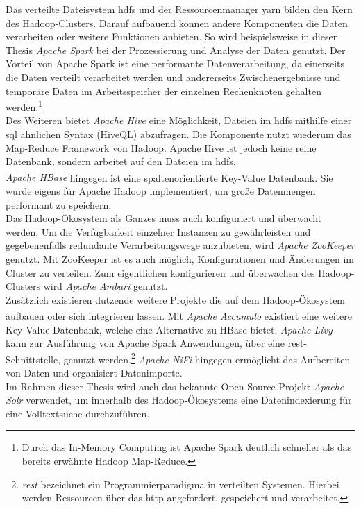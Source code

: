 \noindent
Das verteilte Dateisystem \gls{hdfs} und der Ressourcenmanager \acrshort{yarn} bilden den Kern des Hadoop-Clusters. Darauf aufbauend können andere Komponenten die Daten verarbeiten oder weitere Funktionen anbieten.
So wird beispielsweise in dieser Thesis \textit{Apache Spark\texttrademark\thinspace} bei der Prozessierung und Analyse der Daten genutzt. Der Vorteil von Apache Spark ist eine performante Datenverarbeitung, da einerseits die Daten verteilt verarbeitet werden und andererseits Zwischenergebnisse und temporäre Daten im Arbeitsspeicher der einzelnen Rechenknoten gehalten werden.\footnote{Durch das In-Memory Computing ist Apache Spark deutlich schneller als das bereits erwähnte Hadoop Map-Reduce.}\\
Des Weiteren bietet \textit{Apache Hive\texttrademark\thinspace} eine Möglichkeit, Dateien im \gls{hdfs} mithilfe einer \acrshort{sql} ähnlichen Syntax (HiveQL) abzufragen. Die Komponente nutzt wiederum das Map-Reduce Framework von Hadoop. Apache Hive ist jedoch keine reine Datenbank, sondern arbeitet auf den Dateien im \gls{hdfs}.\\
\textit{Apache HBase\textsuperscript{\textregistered}} hingegen ist eine spaltenorientierte Key-Value Datenbank. Sie wurde eigens für Apache Hadoop implementiert, 
um große Datenmengen performant zu speichern.\\

\noindent
Das Hadoop-Ökosystem als Ganzes muss auch konfiguriert und überwacht werden. Um die Verfügbarkeit einzelner Instanzen zu gewährleisten und gegebenenfalls redundante Verarbeitungswege anzubieten, wird \textit{Apache ZooKeeper\texttrademark\thinspace} genutzt. Mit ZooKeeper ist es auch möglich, Konfigurationen und Änderungen im Cluster zu verteilen. Zum eigentlichen konfigurieren und überwachen des Hadoop-Clusters wird \textit{Apache Ambari\texttrademark\thinspace} genutzt.\\

\noindent
Zusätzlich existieren dutzende weitere Projekte die auf dem Hadoop-Ökosystem aufbauen oder sich integrieren lassen. Mit \textit{Apache Accumulo\textsuperscript{\textregistered}} existiert eine weitere Key-Value Datenbank, welche eine Alternative zu HBase bietet. \textit{Apache Livy} kann zur Ausführung von Apache Spark Anwendungen, über eine \acrshort{rest}-Schnittstelle, genutzt werden.\footnote{\textit{\gls{rest}} bezeichnet ein Programmierparadigma in verteilten Systemen. Hierbei werden Ressourcen über das \gls{http} angefordert, gespeichert und verarbeitet.} \textit{Apache NiFi} hingegen ermöglicht das Aufbereiten von Daten und organisiert Datenimporte.\\
Im Rahmen dieser Thesis wird auch das bekannte Open-Source Projekt \textit{Apache Solr\texttrademark\thinspace} verwendet, um innerhalb des Hadoop-Ökosystems eine Datenindexierung für eine Volltextsuche durchzuführen.\\



